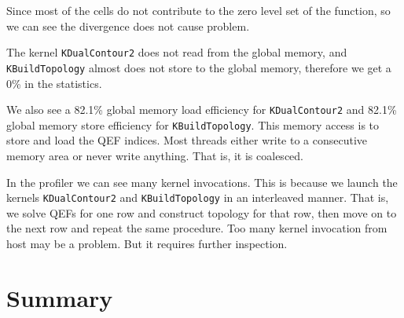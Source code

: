 \documentclass[a4paper,12pt]{article}
\begin{document}
Since most of the cells do not contribute to the zero level set
of the function, so we can see the divergence does not cause problem.

The kernel \texttt{KDualContour2} does not read from the global memory,
and \texttt{KBuildTopology} almost does not store to the global memory,
therefore we get a 0\% in the statistics.

We also see a 82.1\% global memory load efficiency
for \texttt{KDualContour2} and 82.1\% global memory store efficiency for
\texttt{KBuildTopology}.
This memory access is to store and load the QEF indices.
Most threads either write to a consecutive memory area or never write anything.
That is, it is coalesced.

In the profiler we can see many kernel invocations.
This is because we launch the kernels \texttt{KDualContour2} and
\texttt{KBuildTopology}
in an interleaved manner.
That is, we solve QEFs for one row and construct topology for that row,
then move on to the next row and repeat the same procedure.
Too many kernel invocation from host may be a problem.
But it requires further inspection.

\section{Summary}

\newpage
{}


\end{document}
